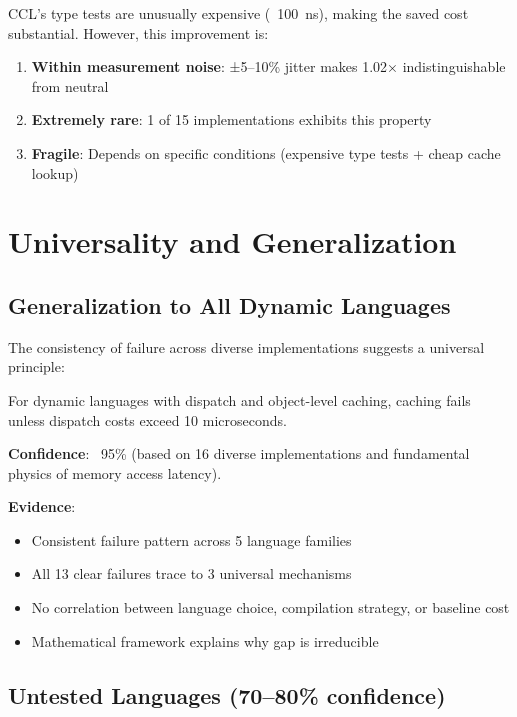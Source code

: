 \documentclass[sigplan,final]{acmart}
\begin{document}
CCL's type tests are unusually expensive (~100~ns), making the saved cost substantial. However,
this improvement is:

\begin{enumerate}
  \item \textbf{Within measurement noise}: ±5--10\% jitter makes 1.02× indistinguishable from neutral
  \item \textbf{Extremely rare}: 1 of 15 implementations exhibits this property
  \item \textbf{Fragile}: Depends on specific conditions (expensive type tests + cheap cache lookup)
\end{enumerate}

\section{Universality and Generalization}

\subsection{Generalization to All Dynamic Languages}

The consistency of failure across diverse implementations suggests a universal principle:

\begin{theorem}
For dynamic languages with dispatch and object-level caching, caching fails unless dispatch
costs exceed 10 microseconds.
\end{theorem}

\textbf{Confidence}: ~95\% (based on 16 diverse implementations and fundamental physics of memory
access latency).

\textbf{Evidence}:
\begin{itemize}
  \item Consistent failure pattern across 5 language families
  \item All 13 clear failures trace to 3 universal mechanisms
  \item No correlation between language choice, compilation strategy, or baseline cost
  \item Mathematical framework explains why gap is irreducible
\end{itemize}

\subsection{Untested Languages (70--80\% confidence)}
\end{document}
